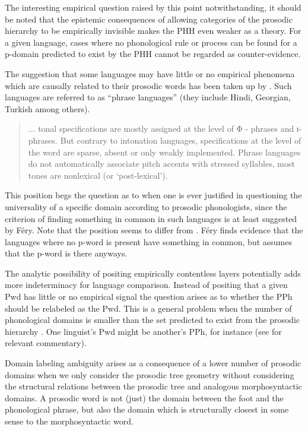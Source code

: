 \documentclass[output=paper,hidelinks]{langscibook}
\begin{document}
The interesting empirical question raised by this point notwithstanding, it should be noted that the epistemic consequences of allowing categories of the prosodic hierarchy to be empirically invisible makes the PHH even weaker as a theory. For a given language, cases where no phonological rule or process can be found for a p-domain predicted to exist by the PHH cannot be regarded as counter-evidence. 

The suggestion that some languages may have little or no empirical phenomena which are causally related to their prosodic words has been taken up by \citet[270]{fery2017intonation}. Such languages are referred to as ``phrase languages'' (they include Hindi, Georgian, Turkish among others).

\begin{quote}
    ... tonal specifications are mostly assigned at the level of Φ - phrases and ι-phrases. But contrary to intonation languages, specifications at the level of the word are sparse, absent or only weakly implemented. Phrase languages do not automatically associate pitch accents with stressed syllables, most tones are nonlexical (or ‘post-lexical’). 
\end{quote}

This position begs the question as to when one is ever justified in questioning the universality of a specific domain according to prosodic phonologists, since the criterion of finding something in common in such languages is at least suggested by Féry. Note that the position seems to differ from \cite{nespor2007prosodic}. Féry finds evidence that the languages where no p-word is present have something in common, but assumes that the p-word is there anyways.

The analytic possibility of positing empirically contentless layers potentially adds more indeterminacy for language comparison. Instead of positing that a given Pwd has little or no empirical signal the question arises as to whether the PPh should be relabeled as the Pwd. This is a general problem when the number of phonological domains is smaller than the set predicted to exist from the prosodic hierarchy \citep{tallman2020beyond}. One linguist's Pwd might be another's PPh, for instance (see \cite[321-322]{michaud2017tone} for relevant commentary).

Domain labeling ambiguity arises as a consequence of a lower number of prosodic domains when we only consider the prosodic tree geometry without considering the structural relations between the prosodic tree and analogous morphosyntactic domains. A prosodic word is not (just) the domain between the foot and the phonological phrase, but also the domain which is structurally closest in some sense to the morphosyntactic word. 
\end{document}
